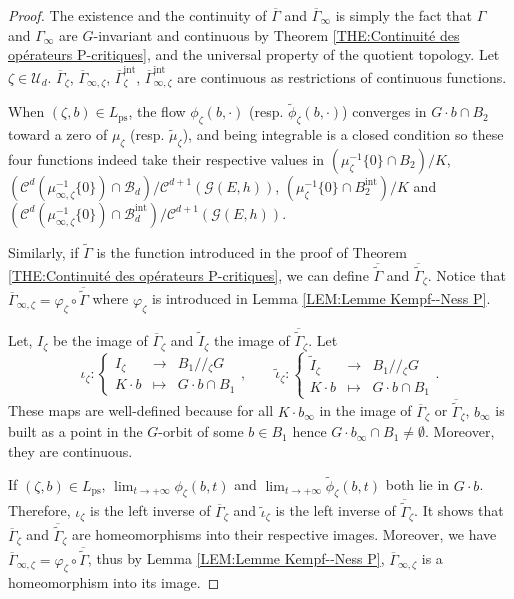 \documentclass{article}
\theoremstyle{remark}
\theoremstyle{definition}
\newcommand{\G}{\mathcal{G}}
\newcommand{\mB}{\mathcal{B}}
\newcommand{\mC}{\mathcal{C}}
\newcommand{\mU}{\mathcal{U}}
\newcommand{\fonction}[4]{\left\{ \begin{array}{rcl}
		\displaystyle #1 & \longrightarrow & \displaystyle #2\\
		\displaystyle #3 & \longmapsto & \displaystyle #4
	\end{array} \right.}
\begin{document}
\begin{proof}
The existence and the continuity of $\overline{\Gamma}$ and $\overline{\Gamma}_\infty$ is simply the fact that $\Gamma$ and $\Gamma_\infty$ are $G$-invariant and continuous by Theorem \ref{THE:Continuité des opérateurs P-critiques}, and the universal property of the quotient topology. Let $\zeta \in \mU_d$. $\overline{\Gamma}_\zeta$, $\overline{\Gamma}_{\infty,\zeta}$, $\overline{\Gamma}_\zeta^{\mathrm{int}}$, $\overline{\Gamma}_{\infty,\zeta}^{\mathrm{int}}$ are continuous as restrictions of continuous functions.

When $(\zeta,b) \in L_{\mathrm{ps}}$, the flow $\phi_\zeta(b,\cdot)$ (resp. $\tilde{\phi}_\zeta(b,\cdot)$) converges in $G \cdot b \cap B_2$ toward a zero of $\mu_\zeta$ (resp. $\tilde{\mu}_\zeta$), and being integrable is a closed condition so these four functions indeed take their respective values in $(\mu_\zeta^{-1}\{0\} \cap B_2)/K$, $(\mC^d(\mu_{\infty,\zeta}^{-1}\{0\}) \cap \mB_d)/\mC^{d + 1}(\G(E,h))$, $(\mu_\zeta^{-1}\{0\} \cap B_2^{\mathrm{int}})/K$ and $(\mC^d(\mu_{\infty,\zeta}^{-1}\{0\}) \cap \mB_d^{\mathrm{int}})/\mC^{d + 1}(\G(E,h))$.

Similarly, if $\tilde{\Gamma}$ is the function introduced in the proof of Theorem \ref{THE:Continuité des opérateurs P-critiques}, we can define $\overline{\tilde{\Gamma}}$ and $\overline{\tilde{\Gamma}}_\zeta$. Notice that $\overline{\Gamma}_{\infty,\zeta} = \varphi_\zeta \circ \overline{\tilde{\Gamma}}$ where $\varphi_\zeta$ is introduced in Lemma \ref{LEM:Lemme Kempf--Ness P}.

Let, $I_\zeta$ be the image of $\overline{\Gamma}_\zeta$ and $\tilde{I}_{\zeta}$ the image of $\overline{\tilde{\Gamma}}_\zeta$. Let
$$
\iota_\zeta : \fonction{I_\zeta}{B_1/\!/\!_\zeta G}{K \cdot b}{G \cdot b \cap B_1}, \qquad \tilde{\iota}_\zeta : \fonction{\tilde{I}_\zeta}{B_1/\!/\!_\zeta G}{K \cdot b}{G \cdot b \cap B_1}.
$$
These maps are well-defined because for all $K \cdot b_\infty$ in the image of $\overline{\Gamma}_\zeta$ or $\overline{\tilde{\Gamma}}_\zeta$, $b_\infty$ is built as a point in the $G$-orbit of some $b \in B_1$ hence $G \cdot b_\infty \cap B_1 \neq \emptyset$. Moreover, they are continuous.

If $(\zeta,b) \in L_{\mathrm{ps}}$, $\lim_{t \rightarrow +\infty} \phi_\zeta(b,t)$ and $\lim_{t \rightarrow +\infty} \tilde{\phi}_\zeta(b,t)$ both lie in $G \cdot b$. Therefore, $\iota_\zeta$ is the left inverse of $\overline{\Gamma}_\zeta$ and $\tilde{\iota}_\zeta$ is the left inverse of $\overline{\tilde{\Gamma}}_\zeta$. It shows that $\overline{\Gamma}_\zeta$ and $\overline{\tilde{\Gamma}}_\zeta$ are homeomorphisms into their respective images. Moreover, we have $\overline{\Gamma}_{\infty,\zeta} = \varphi_\zeta \circ \overline{\tilde{\Gamma}}$, thus by Lemma \ref{LEM:Lemme Kempf--Ness P}, $\overline{\Gamma}_{\infty,\zeta}$ is a homeomorphism into its image.


\end{proof}
\end{document}
